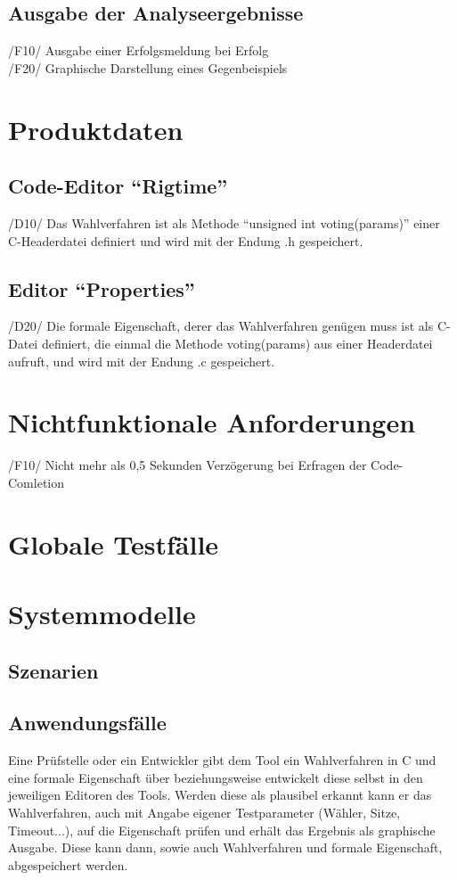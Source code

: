 \documentclass[a4paper]{scrreprt}
\begin{document}
\section{Ausgabe der Analyseergebnisse}
/F10/ Ausgabe einer Erfolgsmeldung bei Erfolg \\
/F20/ Graphische Darstellung eines Gegenbeispiels \\

\chapter{Produktdaten}
\section{Code-Editor "`Rigtime"'}
/D10/ Das Wahlverfahren ist als Methode "`unsigned int voting(params)"' einer C-Headerdatei definiert und wird mit der Endung .h gespeichert.

\section{Editor "`Properties"'}
/D20/ Die formale Eigenschaft, derer das Wahlverfahren genügen muss ist als C-Datei definiert, die einmal die Methode voting(params) aus einer Headerdatei aufruft, und wird mit der Endung .c gespeichert.


\chapter{Nichtfunktionale Anforderungen}
/F10/ Nicht mehr als 0,5 Sekunden Verzögerung bei Erfragen der Code-Comletion


\chapter{Globale Testfälle}


\chapter{Systemmodelle}
\section{Szenarien}
\section{Anwendungsfälle}
Eine Prüfstelle oder ein Entwickler gibt dem Tool ein Wahlverfahren in C und eine formale 
Eigenschaft über beziehungsweise entwickelt diese selbst in den jeweiligen Editoren des Tools. 
Werden diese als plausibel erkannt kann er das Wahlverfahren, auch mit Angabe eigener 
Testparameter (Wähler, Sitze, Timeout...), auf die Eigenschaft prüfen und erhält das Ergebnis 
als graphische Ausgabe. 
Diese kann dann, sowie auch Wahlverfahren und formale Eigenschaft, abgespeichert werden.
\end{document}
